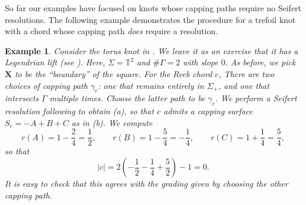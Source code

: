 \documentclass[11pt]{amsart}
\theoremstyle{mystyle}
\newtheorem{example}[example]{Example}
\newcommand{\T}{\mathbb{T}}
\newcommand{\<}{\langle}
\renewcommand{\>}{\rangle}
\begin{document}
So far our examples have focused on knots whose capping paths require no Seifert resolutions. The following example demonstrates the procedure for a trefoil knot with a chord whose capping path \textit{does} require a resolution. 
\begin{example}
    Consider the torus knot in . We leave it as an exercise that it has a Legendrian lift (see ). Here, $\Sigma=\T^2$ and $\#\Gamma=2$ with slope $0$. As before, we pick $\mathbf{X}$ to be the ``boundary'' of the square. For the Reeb chord $c$, There are two choices of capping path $\gamma_c$: one that remains entirely in $\Sigma_+$, and one that intersects $\Gamma$ multiple times. Choose the latter path to be $\gamma_c$. We perform a Seifert resolution following  to obtain (a), so that $c$ admits a capping surface $S_c = -A+B+C$ as in (b). We compute 
\[r(A)= 1-\frac{2}{4} = \frac{1}{2}, \qquad r(B)=1-\frac{5}{4} = -\frac{1}{4},\qquad r(C)=  1+\frac{1}{4} = \frac{5}{4},\]
  so that 
  \[|c| = 2\left(-\frac{1}{2}-\frac{1}{4}+\frac{5}{2}\right)-1=0.\]
It is easy to check that this agrees with the grading given by choosing the other capping path. 
\end{example}
\end{document}
